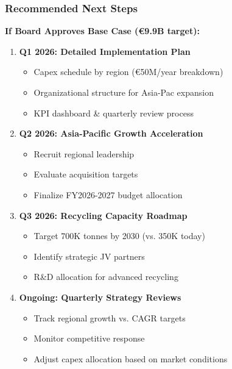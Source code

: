 \documentclass[aspectratio=169,12pt,xcolor=dvipsnames]{beamer}
\begin{document}
\begin{frame}
  \frametitle{Recommended Next Steps}

  \textbf{If Board Approves Base Case (€9.9B target):}

  \vspace{0.5cm}

  \begin{enumerate}

    \item \textbf{Q1 2026: Detailed Implementation Plan}
    \begin{itemize}
      \item Capex schedule by region (€50M/year breakdown)
      \item Organizational structure for Asia-Pac expansion
      \item KPI dashboard \& quarterly review process
    \end{itemize}

    \item \textbf{Q2 2026: Asia-Pacific Growth Acceleration}
    \begin{itemize}
      \item Recruit regional leadership
      \item Evaluate acquisition targets
      \item Finalize FY2026-2027 budget allocation
    \end{itemize}

    \item \textbf{Q3 2026: Recycling Capacity Roadmap}
    \begin{itemize}
      \item Target 700K tonnes by 2030 (vs. 350K today)
      \item Identify strategic JV partners
      \item R\&D allocation for advanced recycling
    \end{itemize}

    \item \textbf{Ongoing: Quarterly Strategy Reviews}
    \begin{itemize}
      \item Track regional growth vs. CAGR targets
      \item Monitor competitive response
      \item Adjust capex allocation based on market conditions
    \end{itemize}

  \end{enumerate}

\end{frame}
\end{document}
